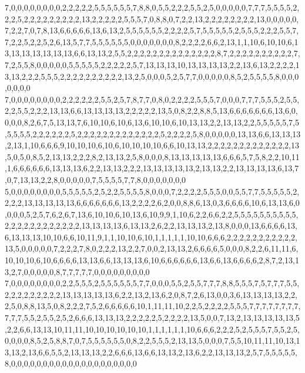 7,0,0,0,0,0,0,0,0,2,2,2,2,2,5,5,5,5,5,5,7,8,8,0,5,5,2,2,2,5,5,2,5,0,0,0,0,0,7,7,7,5,5,5,5,2,2,2,5,2,2,2,2,2,2,2,2,2,13,2,2,2,2,2,5,5,5,7,0,8,8,0,7,2,2,13,2,2,2,2,2,2,2,2,13,0,0,0,0,0,7,2,2,7,0,7,8,13,6,6,6,6,6,13,6,13,2,5,5,5,5,5,5,2,2,2,2,5,7,5,5,5,5,5,2,5,5,5,2,2,2,5,5,7,7,2,2,5,2,2,5,2,6,13,5,7,7,5,5,5,5,5,5,0,0,0,0,0,0,0,8,2,2,2,2,6,6,2,13,1,1,10,6,10,10,6,13,13,13,13,13,13,13,6,6,13,13,2,5,5,2,2,2,2,2,2,2,2,2,2,2,2,2,2,8,7,2,2,2,2,2,2,2,2,2,2,7,7,2,5,5,8,0,0,0,0,0,5,5,5,5,5,2,2,2,2,2,5,7,13,13,13,10,13,13,13,13,2,2,13,6,13,2,2,2,2,13,13,2,2,2,5,5,5,2,2,2,2,2,2,2,2,2,2,13,2,5,0,0,0,5,2,5,7,7,0,0,0,0,0,8,5,2,5,5,5,5,8,0,0,0,0,0,0,0
7,0,0,0,0,0,0,0,0,2,2,2,2,2,2,5,5,2,5,7,8,7,7,0,8,0,2,2,2,2,5,5,5,7,0,0,0,7,7,7,5,5,5,2,5,5,2,2,5,5,2,2,2,13,13,6,6,13,13,13,13,2,2,2,2,2,13,5,0,8,2,2,8,8,5,13,6,6,6,6,6,6,6,13,6,0,0,0,0,8,2,6,7,5,13,13,7,6,10,10,6,10,6,13,6,10,10,6,10,13,13,2,2,13,13,2,2,5,5,5,5,5,7,5,5,5,5,5,2,2,2,2,2,2,5,2,2,2,2,2,2,2,2,2,2,2,2,2,5,2,2,2,2,5,8,0,0,0,0,0,13,13,6,6,13,13,13,2,13,1,10,6,6,6,9,10,10,10,6,10,6,10,10,10,10,6,6,10,13,13,2,2,2,2,2,2,2,2,2,2,2,2,2,13,5,0,5,0,8,5,2,13,13,2,2,2,8,2,13,13,2,5,8,0,0,0,8,13,13,13,13,13,6,6,6,5,7,5,8,2,2,10,11,1,6,6,6,6,6,6,13,13,13,6,2,2,13,13,2,2,2,13,13,13,13,13,2,13,13,2,2,13,13,13,13,6,13,7,0,7,13,13,2,2,8,0,0,0,0,0,7,5,5,5,5,7,7,8,0,0,0,0,0,0,0
5,0,0,0,0,0,0,0,0,5,5,5,5,5,2,5,2,2,5,5,5,5,8,0,0,0,7,2,2,2,2,5,5,5,0,0,5,5,7,7,5,5,5,5,5,2,2,2,2,13,13,13,13,13,6,6,6,6,6,6,6,13,2,2,2,2,6,2,0,0,8,8,6,13,0,3,6,6,6,6,10,6,13,13,6,0,0,0,0,5,2,5,7,6,2,6,7,13,6,10,10,6,10,13,6,10,9,9,1,10,6,2,2,6,6,2,2,5,5,5,5,5,5,5,5,5,5,2,2,2,2,2,2,2,2,2,2,2,2,13,13,13,13,6,13,13,2,6,2,2,13,13,13,2,13,8,0,0,0,13,6,6,6,6,13,6,13,13,13,10,10,6,6,10,11,9,1,1,10,10,6,10,1,1,1,1,1,10,10,6,6,6,2,2,2,2,2,2,2,2,2,2,2,13,5,0,0,0,0,0,7,2,2,2,7,8,0,2,2,2,13,2,2,7,0,0,2,13,13,2,6,6,6,6,5,0,0,0,8,2,2,6,11,11,6,10,10,10,6,10,6,6,6,6,13,13,6,6,13,13,13,6,10,6,6,6,6,6,6,13,6,6,13,6,6,6,6,2,8,7,2,13,13,2,7,0,0,0,0,0,8,7,7,7,7,7,0,0,0,0,0,0,0,0,0
7,0,0,0,0,0,0,0,0,2,2,5,5,5,2,5,5,5,5,5,5,7,7,0,0,0,5,5,2,5,5,7,7,7,8,8,5,5,5,7,5,7,7,7,5,5,2,2,2,2,2,2,2,2,2,13,13,13,13,13,6,2,2,13,2,13,6,2,0,8,7,2,6,13,0,0,3,6,13,13,13,13,2,2,2,5,0,8,8,13,5,0,8,2,2,2,7,5,2,6,6,6,6,6,10,1,11,11,10,2,2,5,2,2,2,2,5,5,5,7,7,7,7,7,7,7,7,7,7,7,5,5,2,5,5,2,5,2,6,6,6,13,13,13,2,2,2,2,2,5,2,2,2,2,13,5,0,0,7,13,2,13,13,13,13,13,5,2,2,6,6,13,13,10,11,11,10,10,10,10,10,10,1,1,1,1,1,1,10,6,6,6,2,2,2,5,2,5,5,5,7,5,5,2,5,0,0,0,0,8,5,2,5,8,8,7,0,7,5,5,5,5,5,5,0,8,2,2,5,5,5,2,13,13,5,0,0,0,7,5,5,10,11,11,10,13,13,13,2,13,6,6,5,5,2,13,13,13,2,2,6,6,6,13,6,6,13,13,2,13,6,2,2,13,13,13,2,5,7,5,5,5,5,5,8,0,0,0,0,0,0,0,0,0,0,0,0,0,0,0,0,0,0,0,0
